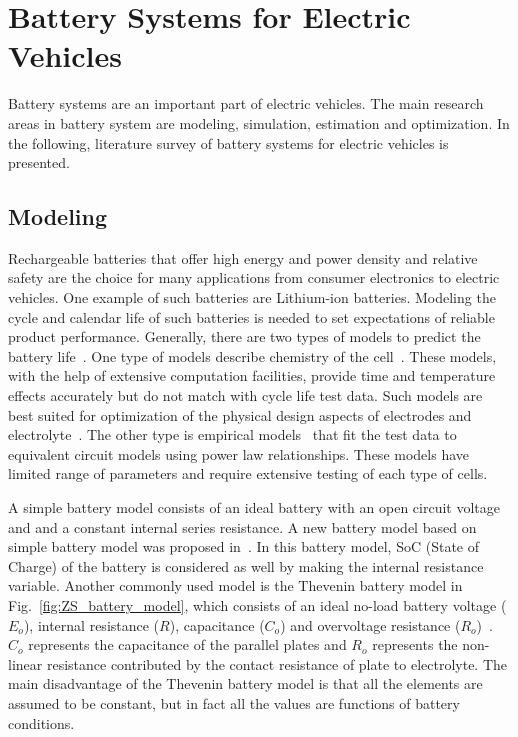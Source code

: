 \section{Battery Systems for Electric Vehicles} \label{sec:battery}

Battery systems are an important part of electric vehicles.  The main research areas in battery system are modeling, simulation, estimation and optimization. In the following, literature survey of battery systems for electric vehicles is presented. 

\subsection{Modeling}

Rechargeable batteries that offer high energy and
power density and relative safety are the choice for many applications from consumer
electronics to electric vehicles. One example of such batteries are Lithium-ion batteries. Modeling the cycle and
calendar life of such batteries is needed to set
expectations of reliable product performance. Generally, there are two types of models to predict the battery life~\cite{ZS_millner}. One type of models describe chemistry of the cell~\cite{ZS_Ning}. These models, with the help of extensive computation facilities, provide time and temperature effects accurately but do not match with cycle life test data. Such models are best suited for
optimization of the physical design aspects of electrodes
and electrolyte~\cite{ZS_den}. The other type is empirical models~\cite{ZS_dubarry} that fit the test data to equivalent circuit models using power law relationships. These models have limited range of parameters and require extensive testing of each type of cells. 

A simple battery model consists of an ideal battery with an open circuit voltage and and a constant internal series resistance. A new battery model based on simple battery model was proposed in~\cite{ZS_jean}. In this battery model, SoC (State of Charge) of the battery is considered as well by making the internal resistance variable. Another commonly used model is the Thevenin battery
model in Fig.~\ref{fig:ZS_battery_model}, which consists of an ideal no-load battery voltage ($E_o$),
internal resistance ($R$), capacitance ($C_o$) and overvoltage
resistance ($R_o$)~\cite{ZS_salameh}. $C_o$ represents the capacitance of the parallel
plates and $R_o$ represents the non-linear resistance contributed
by the contact resistance of plate to electrolyte. The main disadvantage of the Thevenin battery model is that
all the elements are assumed to be constant, but in fact all the
values are functions of battery conditions.


